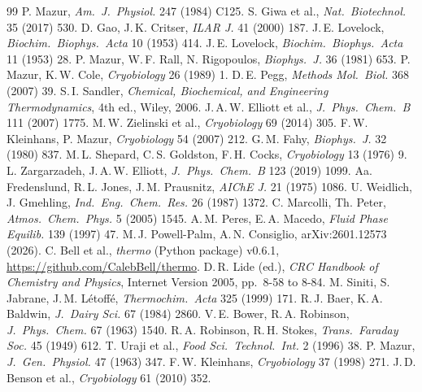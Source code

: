 \documentclass[10pt,a4paper,twocolumn]{article}
\begin{document}
\renewcommand{\refname}{\normalsize\bfseries References}
\begin{thebibliography}{99}
\scriptsize
\setlength{\itemsep}{-1.2pt}\setlength{\parsep}{0pt}
 P. Mazur, \emph{Am.\ J.\ Physiol.} 247 (1984) C125.
 S. Giwa et al., \emph{Nat.\ Biotechnol.} 35 (2017) 530.
 D. Gao, J.\,K. Critser, \emph{ILAR J.} 41 (2000) 187.
 J.\,E. Lovelock, \emph{Biochim.\ Biophys.\ Acta} 10 (1953) 414.
 J.\,E. Lovelock, \emph{Biochim.\ Biophys.\ Acta} 11 (1953) 28.
 P. Mazur, W.\,F. Rall, N. Rigopoulos, \emph{Biophys.\ J.} 36 (1981) 653.
 P. Mazur, K.\,W. Cole, \emph{Cryobiology} 26 (1989) 1.
 D.\,E. Pegg, \emph{Methods Mol.\ Biol.} 368 (2007) 39.
 S.\,I. Sandler, \emph{Chemical, Biochemical, and Engineering Thermodynamics}, 4th ed., Wiley, 2006.
 J.\,A.\,W. Elliott et al., \emph{J.\ Phys.\ Chem.\ B} 111 (2007) 1775.
 M.\,W. Zielinski et al., \emph{Cryobiology} 69 (2014) 305.
 F.\,W. Kleinhans, P. Mazur, \emph{Cryobiology} 54 (2007) 212.
 G.\,M. Fahy, \emph{Biophys.\ J.} 32 (1980) 837.
 M.\,L. Shepard, C.\,S. Goldston, F.\,H. Cocks, \emph{Cryobiology} 13 (1976) 9.
 L. Zargarzadeh, J.\,A.\,W. Elliott, \emph{J.\ Phys.\ Chem.\ B} 123 (2019) 1099.
 Aa. Fredenslund, R.\,L. Jones, J.\,M. Prausnitz, \emph{AIChE J.} 21 (1975) 1086.
 U. Weidlich, J. Gmehling, \emph{Ind.\ Eng.\ Chem.\ Res.} 26 (1987) 1372.
 C. Marcolli, Th. Peter, \emph{Atmos.\ Chem.\ Phys.} 5 (2005) 1545.
 A.\,M. Peres, E.\,A. Macedo, \emph{Fluid Phase Equilib.} 139 (1997) 47.
 M.\,J. Powell-Palm, A.\,N. Consiglio, arXiv:2601.12573 (2026).
 C. Bell et al., \emph{thermo} (Python package) v0.6.1, \url{https://github.com/CalebBell/thermo}.
 D.\,R. Lide (ed.), \emph{CRC Handbook of Chemistry and Physics}, Internet Version 2005, pp.\ 8-58 to 8-84.
 M. Siniti, S. Jabrane, J.\,M. L\'etoff\'e, \emph{Thermochim.\ Acta} 325 (1999) 171.
 R.\,J. Baer, K.\,A. Baldwin, \emph{J.\ Dairy Sci.} 67 (1984) 2860.
 V.\,E. Bower, R.\,A. Robinson, \emph{J.\ Phys.\ Chem.} 67 (1963) 1540.
 R.\,A. Robinson, R.\,H. Stokes, \emph{Trans.\ Faraday Soc.} 45 (1949) 612.
 T. Uraji et al., \emph{Food Sci.\ Technol.\ Int.} 2 (1996) 38.
 P. Mazur, \emph{J.\ Gen.\ Physiol.} 47 (1963) 347.
 F.\,W. Kleinhans, \emph{Cryobiology} 37 (1998) 271.
 J.\,D. Benson et al., \emph{Cryobiology} 61 (2010) 352.
\end{thebibliography}
\end{document}
